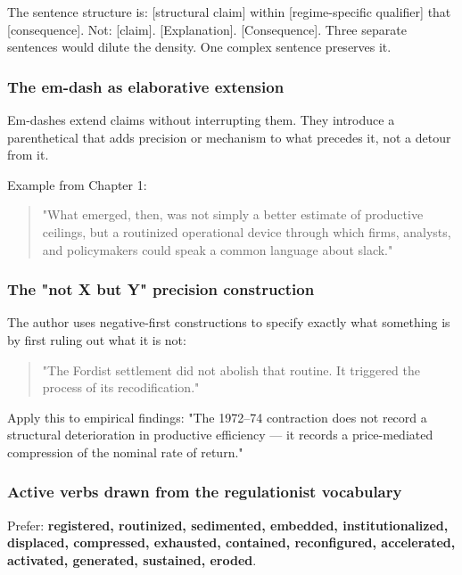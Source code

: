 The sentence structure is: {[}structural claim{]} within
{[}regime-specific qualifier{]} that {[}consequence{]}. Not:
{[}claim{]}. {[}Explanation{]}. {[}Consequence{]}. Three separate
sentences would dilute the density. One complex sentence preserves it.

\subsubsection{The em-dash as elaborative
extension}\label{the-em-dash-as-elaborative-extension}

Em-dashes extend claims without interrupting them. They introduce a
parenthetical that adds precision or mechanism to what precedes it, not
a detour from it.

Example from Chapter 1:

\begin{quote}
"What emerged, then, was not simply a better estimate of productive
ceilings, but a routinized operational device through which firms,
analysts, and policymakers could speak a common language about slack."
\end{quote}

\subsubsection{The "not X but Y" precision
construction}\label{the-not-x-but-y-precision-construction}

The author uses negative-first constructions to specify exactly what
something is by first ruling out what it is not:

\begin{quote}
"The Fordist settlement did not abolish that routine. It triggered the
process of its recodification."
\end{quote}

Apply this to empirical findings: "The 1972--74 contraction does not
record a structural deterioration in productive efficiency --- it
records a price-mediated compression of the nominal rate of return."

\subsubsection{Active verbs drawn from the regulationist
vocabulary}\label{active-verbs-drawn-from-the-regulationist-vocabulary}

Prefer: \textbf{registered, routinized, sedimented, embedded,
institutionalized, displaced, compressed, exhausted, contained,
reconfigured, accelerated, activated, generated, sustained, eroded}.

